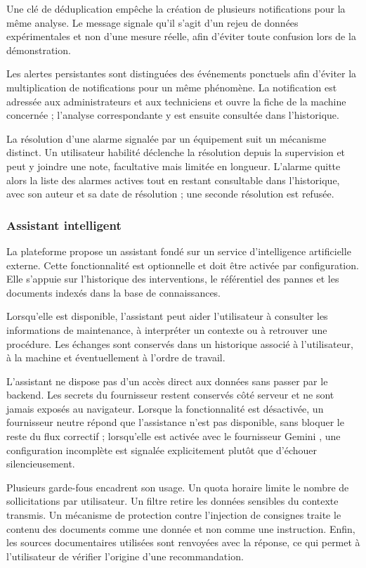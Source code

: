 Une clé de déduplication empêche la création de plusieurs notifications pour la même analyse. Le message signale qu'il s'agit d'un rejeu de données expérimentales et non d'une mesure réelle, afin d'éviter toute confusion lors de la démonstration.

Les alertes persistantes sont distinguées des événements ponctuels afin d'éviter la multiplication de notifications pour un même phénomène. La notification est adressée aux administrateurs et aux techniciens et ouvre la fiche de la machine concernée ; l'analyse correspondante y est ensuite consultée dans l'historique.

La résolution d'une alarme signalée par un équipement suit un mécanisme distinct. Un utilisateur habilité déclenche la résolution depuis la supervision et peut y joindre une note, facultative mais limitée en longueur. L'alarme quitte alors la liste des alarmes actives tout en restant consultable dans l'historique, avec son auteur et sa date de résolution ; une seconde résolution est refusée.

\subsubsection{Assistant intelligent}

La plateforme propose un assistant fondé sur un service d'intelligence artificielle externe. Cette fonctionnalité est optionnelle et doit être activée par configuration. Elle s'appuie sur l'historique des interventions, le référentiel des pannes et les documents indexés dans la base de connaissances.

Lorsqu'elle est disponible, l'assistant peut aider l'utilisateur à consulter les informations de maintenance, à interpréter un contexte ou à retrouver une procédure. Les échanges sont conservés dans un historique associé à l'utilisateur, à la machine et éventuellement à l'ordre de travail.

L'assistant ne dispose pas d'un accès direct aux données sans passer par le backend. Les secrets du fournisseur restent conservés côté serveur et ne sont jamais exposés au navigateur. Lorsque la fonctionnalité est désactivée, un fournisseur neutre répond que l'assistance n'est pas disponible, sans bloquer le reste du flux correctif ; lorsqu'elle est activée avec le fournisseur Gemini \cite{gemini_api}, une configuration incomplète est signalée explicitement plutôt que d'échouer silencieusement.

Plusieurs garde-fous encadrent son usage. Un quota horaire limite le nombre de sollicitations par utilisateur. Un filtre retire les données sensibles du contexte transmis. Un mécanisme de protection contre l'injection de consignes traite le contenu des documents comme une donnée et non comme une instruction. Enfin, les sources documentaires utilisées sont renvoyées avec la réponse, ce qui permet à l'utilisateur de vérifier l'origine d'une recommandation.

